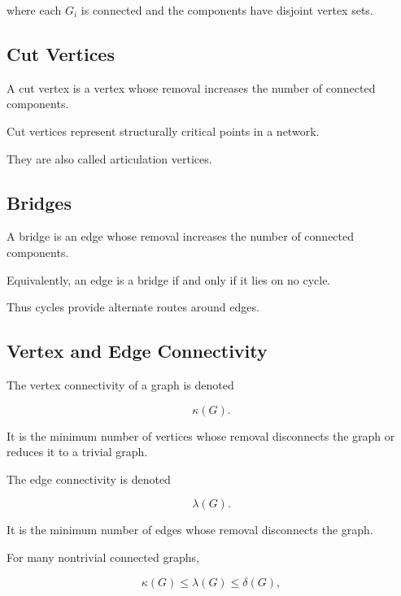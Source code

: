 where each \(G_i\) is connected and the components have disjoint vertex
sets.

\subsection{Cut Vertices}
\label{subsec:cut-vertices}

A cut vertex is a vertex whose removal increases the number of connected
components.

Cut vertices represent structurally critical points in a network.

They are also called articulation vertices.

\subsection{Bridges}
\label{subsec:bridges}

A bridge is an edge whose removal increases the number of connected
components.

Equivalently, an edge is a bridge if and only if it lies on no cycle.

Thus cycles provide alternate routes around edges.

\subsection{Vertex and Edge Connectivity}
\label{subsec:vertex-edge-connectivity}

The vertex connectivity of a graph is denoted

\[
\boxed{
\kappa(G).
}
\]

It is the minimum number of vertices whose removal disconnects the graph
or reduces it to a trivial graph.

The edge connectivity is denoted

\[
\boxed{
\lambda(G).
}
\]

It is the minimum number of edges whose removal disconnects the graph.

For many nontrivial connected graphs,

\[
\boxed{
\kappa(G)\leq\lambda(G)\leq\delta(G),
}
\]


